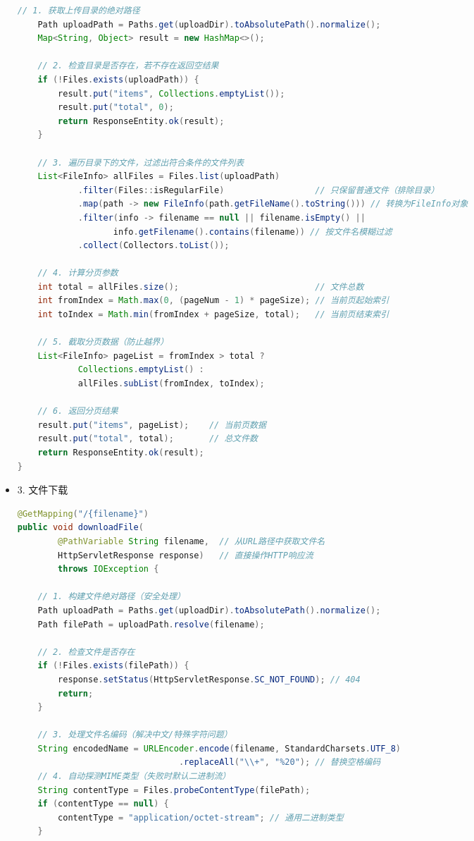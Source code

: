 \documentclass[bachelor]{thesis-uestc}
\begin{document}
\begin{itemize}
\begin{lstlisting}[language=Java]
    // 1. 获取上传目录的绝对路径
    Path uploadPath = Paths.get(uploadDir).toAbsolutePath().normalize();
    Map<String, Object> result = new HashMap<>();
    
    // 2. 检查目录是否存在，若不存在返回空结果
    if (!Files.exists(uploadPath)) {
        result.put("items", Collections.emptyList());
        result.put("total", 0);
        return ResponseEntity.ok(result);
    }
    
    // 3. 遍历目录下的文件，过滤出符合条件的文件列表
    List<FileInfo> allFiles = Files.list(uploadPath)
            .filter(Files::isRegularFile)                  // 只保留普通文件（排除目录）
            .map(path -> new FileInfo(path.getFileName().toString())) // 转换为FileInfo对象
            .filter(info -> filename == null || filename.isEmpty() || 
                   info.getFilename().contains(filename)) // 按文件名模糊过滤
            .collect(Collectors.toList());
    
    // 4. 计算分页参数
    int total = allFiles.size();                           // 文件总数
    int fromIndex = Math.max(0, (pageNum - 1) * pageSize); // 当前页起始索引
    int toIndex = Math.min(fromIndex + pageSize, total);   // 当前页结束索引
    
    // 5. 截取分页数据（防止越界）
    List<FileInfo> pageList = fromIndex > total ? 
            Collections.emptyList() : 
            allFiles.subList(fromIndex, toIndex);
    
    // 6. 返回分页结果
    result.put("items", pageList);    // 当前页数据
    result.put("total", total);       // 总文件数
    return ResponseEntity.ok(result);
}
\end{lstlisting}
\item 3. 文件下载
\begin{lstlisting}[language=Java]
@GetMapping("/{filename}")
public void downloadFile(
        @PathVariable String filename,  // 从URL路径中获取文件名
        HttpServletResponse response)   // 直接操作HTTP响应流
        throws IOException {
    
    // 1. 构建文件绝对路径（安全处理）
    Path uploadPath = Paths.get(uploadDir).toAbsolutePath().normalize();
    Path filePath = uploadPath.resolve(filename);
    
    // 2. 检查文件是否存在
    if (!Files.exists(filePath)) {
        response.setStatus(HttpServletResponse.SC_NOT_FOUND); // 404
        return;
    }

    // 3. 处理文件名编码（解决中文/特殊字符问题）
    String encodedName = URLEncoder.encode(filename, StandardCharsets.UTF_8)
                                .replaceAll("\\+", "%20"); // 替换空格编码
    // 4. 自动探测MIME类型（失败时默认二进制流）
    String contentType = Files.probeContentType(filePath);
    if (contentType == null) {
        contentType = "application/octet-stream"; // 通用二进制类型
    }


\end{lstlisting}
\end{itemize}
\end{document}
